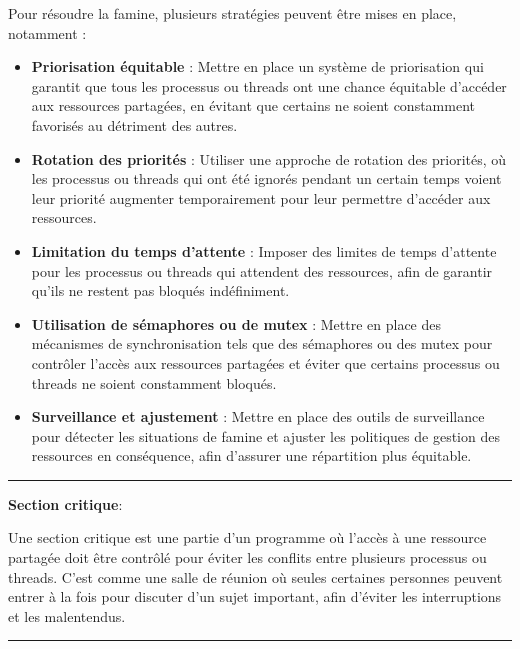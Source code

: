 \noindent Pour résoudre la famine, plusieurs stratégies peuvent être mises en place, notamment :
\begin{itemize}
    \item \textbf{Priorisation équitable} : Mettre en place un système de priorisation qui garantit que tous les processus ou threads ont une chance équitable d'accéder aux ressources partagées, en évitant que certains ne soient constamment favorisés au détriment des autres.
    \item \textbf{Rotation des priorités} : Utiliser une approche de rotation des priorités, où les processus ou threads qui ont été ignorés pendant un certain temps voient leur priorité augmenter temporairement pour leur permettre d'accéder aux ressources.
    \item \textbf{Limitation du temps d'attente} : Imposer des limites de temps d'attente pour les processus ou threads qui attendent des ressources, afin de garantir qu'ils ne restent pas bloqués indéfiniment.
    \item \textbf{Utilisation de sémaphores ou de mutex} : Mettre en place des mécanismes de synchronisation tels que des sémaphores ou des mutex pour contrôler l'accès aux ressources partagées et éviter que certains processus ou threads ne soient constamment bloqués.
    \item \textbf{Surveillance et ajustement} : Mettre en place des outils de surveillance pour détecter les situations de famine et ajuster les politiques de gestion des ressources en conséquence, afin d'assurer une répartition plus équitable.
\end{itemize}

\begin{center}
\rule{5cm}{0.4pt}
\end{center}

\vspace{0.5cm}

\noindent \textbf{Section critique}:

\noindent Une section critique est une partie d'un programme où l'accès à une ressource partagée doit être contrôlé pour éviter les conflits entre plusieurs processus ou threads. C'est comme une salle de réunion où seules certaines personnes peuvent entrer à la fois pour discuter d'un sujet important, afin d'éviter les interruptions et les malentendus.

\begin{center}
\rule{5cm}{0.4pt}
\end{center}


